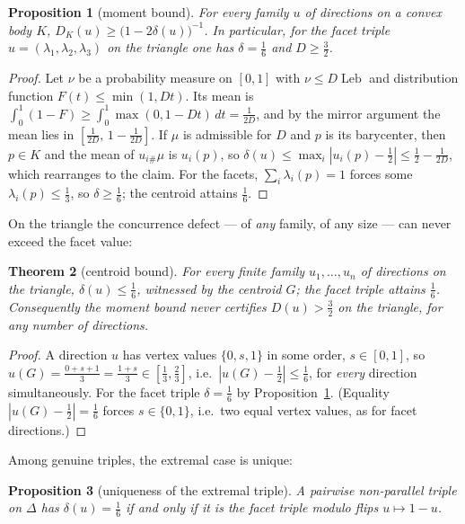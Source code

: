 \documentclass[11pt,reqno]{amsart}
\theoremstyle{plain}
\newtheorem{theorem}{Theorem}[section]
\newtheorem{proposition}[theorem]{Proposition}
\theoremstyle{definition}
\theoremstyle{remark}
\newcommand{\Leb}{\operatorname{Leb}}
\begin{document}
\begin{proposition}[moment bound]\label{prop:moment}
For every family $u$ of directions on a convex body $K$,
$D_K(u)\ge\bigl(1-2\delta(u)\bigr)^{-1}$. In particular, for the facet triple
$u=(\lambda_1,\lambda_2,\lambda_3)$ on the triangle one has $\delta=\tfrac16$
and $D\ge\tfrac32$.
\end{proposition}

\begin{proof}
Let $\nu$ be a probability measure on $[0,1]$ with $\nu\le D\Leb$ and
distribution function $F(t)\le\min(1,Dt)$. Its mean is
$\int_0^1(1-F)\ge\int_0^1\max(0,1-Dt)\,dt=\tfrac1{2D}$, and by the mirror
argument the mean lies in $[\tfrac1{2D},\,1-\tfrac1{2D}]$. If $\mu$ is
admissible for $D$ and $p$ is its barycenter, then $p\in K$ and the mean of
$u_{i\#}\mu$ is $u_i(p)$, so
$\delta(u)\le\max_i|u_i(p)-\tfrac12|\le\tfrac12-\tfrac1{2D}$, which rearranges
to the claim. For the facets, $\sum_i\lambda_i(p)=1$ forces some
$\lambda_i(p)\le\tfrac13$, so $\delta\ge\tfrac16$; the centroid attains
$\tfrac16$.
\end{proof}

On the triangle the concurrence defect --- of \emph{any} family, of any size
--- can never exceed the facet value:

\begin{theorem}[centroid bound]\label{thm:centroid}
For every finite family $u_1,\dots,u_n$ of directions on the triangle,
$\delta(u)\le\tfrac16$, witnessed by the centroid $G$; the facet triple attains
$\tfrac16$. Consequently the moment bound never certifies
$D(u)>\tfrac32$ on the triangle, for any number of directions.
\end{theorem}

\begin{proof}
A direction $u$ has vertex values $\{0,s,1\}$ in some order, $s\in[0,1]$, so
$u(G)=\tfrac{0+s+1}3=\tfrac{1+s}3\in[\tfrac13,\tfrac23]$, i.e.\
$|u(G)-\tfrac12|\le\tfrac16$, for \emph{every} direction simultaneously. For
the facet triple $\delta=\tfrac16$ by Proposition~\ref{prop:moment}. (Equality
$|u(G)-\tfrac12|=\tfrac16$ forces $s\in\{0,1\}$, i.e.\ two equal vertex
values, as for facet directions.)
\end{proof}

Among genuine triples, the extremal case is unique:

\begin{proposition}[uniqueness of the extremal triple]\label{prop:deltamax}
A pairwise non-parallel triple on $\Delta$ has $\delta(u)=\tfrac16$ if and
only if it is the facet triple modulo flips $u\mapsto1-u$.
\end{proposition}
\end{document}
